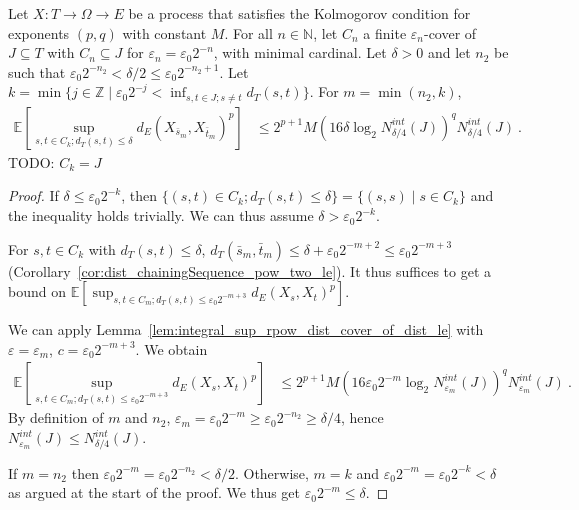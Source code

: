 \begin{lemma}\label{lem:integral_sup_rpow_dist_cover_rescale}
  \leanok
Let $X : T \to \Omega \to E$ be a process that satisfies the Kolmogorov condition for exponents $(p,q)$ with constant $M$.
For all $n \in \mathbb{N}$, let $C_n$ a finite $\varepsilon_n$-cover of $J \subseteq T$ with $C_n \subseteq J$ for $\varepsilon_n = \varepsilon_0 2^{-n}$, with minimal cardinal.
Let $\delta > 0$ and let $n_2$ be such that $\varepsilon_0 2^{-n_2} < \delta/2 \le \varepsilon_0 2^{-n_2+1}$.
Let $k = \min \{j \in \mathbb{Z} \mid \varepsilon_0 2^{-j} < \inf_{s, t \in J; s \ne t}d_T(s, t)\}$.
For $m = \min(n_2, k)$,
\begin{align*}
  \mathbb{E} \left[ \sup_{s, t \in C_k; d_T(s, t) \le \delta} d_E(X_{\bar{s}_m}, X_{\bar{t}_m})^p \right]
  &\le 2^{p+1} M \left(16 \delta \log_2 N^{int}_{\delta/4}(J) \right)^q  N^{int}_{\delta/4}(J)
  \: .
\end{align*}
TODO: $C_k = J$
\end{lemma}

\begin{proof}
If $\delta \le \varepsilon_0 2^{-k}$, then $\{(s, t) \in C_k; d_T(s, t) \le \delta\} = \{(s, s) \mid s \in C_k\}$ and the inequality holds trivially.
We can thus assume $\delta > \varepsilon_0 2^{-k}$.

For $s, t \in C_k$ with $d_T(s, t) \le \delta$, $d_T(\bar{s}_m, \bar{t}_m) \le \delta + \varepsilon_0 2^{-m+2} \le \varepsilon_0 2^{-m+3}$ (Corollary~\ref{cor:dist_chainingSequence_pow_two_le}).
It thus suffices to get a bound on $\mathbb{E} \left[ \sup_{s, t \in C_m; d_T(s, t) \le \varepsilon_0 2^{-m+3}} d_E(X_s, X_t)^p \right]$.

We can apply Lemma~\ref{lem:integral_sup_rpow_dist_cover_of_dist_le} with $\varepsilon = \varepsilon_m$, $c = \varepsilon_0 2^{-m+3}$. We obtain
\begin{align*}
  \mathbb{E} \left[ \sup_{s, t \in C_m; d_T(s, t) \le \varepsilon_0 2^{-m+3}} d_E(X_s, X_t)^p \right]
  &\le 2^{p+1} M \left(16 \varepsilon_0 2^{-m} \log_2 N^{int}_{\varepsilon_m}(J) \right)^q  N^{int}_{\varepsilon_m}(J)
  \: .
\end{align*}
By definition of $m$ and $n_2$, $\varepsilon_m = \varepsilon_0 2^{-m} \ge \varepsilon_0 2^{-n_2} \ge \delta/4$,
hence $N^{int}_{\varepsilon_m}(J) \le N^{int}_{\delta / 4}(J)$.

If $m = n_2$ then $\varepsilon_0 2^{-m} = \varepsilon_0 2^{-n_2} < \delta/2$.
Otherwise, $m = k$ and $\varepsilon_0 2^{-m} = \varepsilon_0 2^{-k} < \delta$ as argued at the start of the proof.
We thus get $\varepsilon_0 2^{-m} \le \delta$.
\end{proof}



